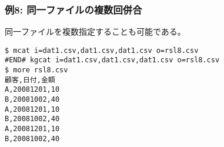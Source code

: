 \subsubsection*{例8: 同一ファイルの複数回併合}

同一ファイルを複数指定することも可能である。


\begin{Verbatim}[baselinestretch=0.7,frame=single]
$ mcat i=dat1.csv,dat1.csv,dat1.csv o=rsl8.csv
#END# kgcat i=dat1.csv,dat1.csv,dat1.csv o=rsl8.csv
$ more rsl8.csv
顧客,日付,金額
A,20081201,10
B,20081002,40
A,20081201,10
B,20081002,40
A,20081201,10
B,20081002,40
\end{Verbatim}

